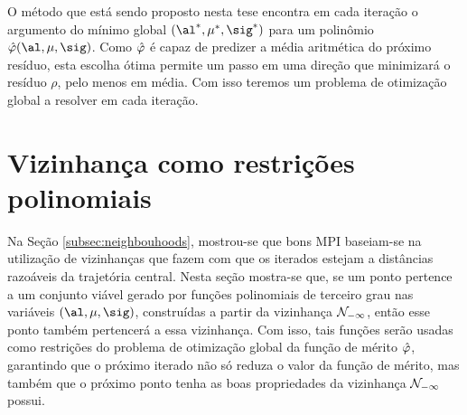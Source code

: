 O método que está sendo proposto nesta tese encontra em cada iteração o
argumento do mínimo global $(\al^*,\mu^*,\sig^*)$ para um polinômio
 $\nextphi(\al,\mu,\sig)$. Como $\hat{\varphi}$ é capaz de predizer a média
 aritmética do próximo resíduo, esta escolha ótima permite um passo em uma
 direção que minimizará  o resíduo $\rho$, pelo menos em média. Com isso
 teremos um problema de otimização global a resolver em cada iteração.
 
 
 \section{Vizinhança como restrições polinomiais}
 Na Seção \ref{subsec:neighbouhoods}, mostrou-se que bons \acl{MPI} baseiam-se na
  utilização de vizinhanças que fazem com que os iterados estejam a distâncias
  razoáveis da trajetória central. Nesta seção mostra-se  que, se um
  ponto pertence a um conjunto viável  gerado por funções polinomiais de terceiro grau 
  nas variáveis $(\al,\mu,\sig)$, construídas a
  partir da vizinhança  $\mathcal{N}_{-\infty}$, então esse ponto  também pertencerá
  a essa vizinhança.
  Com isso, tais funções serão usadas como restrições do problema de otimização
  global da função de mérito $\hat{\varphi}$, garantindo que o próximo
  iterado não só reduza o valor da função de mérito, mas também que o próximo
  ponto tenha as boas propriedades  da  vizinhança $\mathcal{N}_{-\infty}$ possui.
  
  







